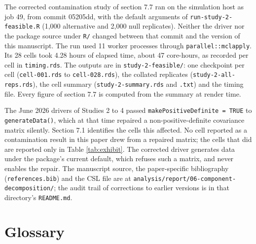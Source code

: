 \documentclass[
  11pt,
]{article}
\begin{document}
The corrected contamination study of section 7.7 ran on the simulation
host as job 49, from commit 05205dd, with the default arguments of
\texttt{run-study-2-feasible.R} (1,000 alternative and 2,000 null
replicates). Neither the driver nor the package source under
\texttt{R/} changed between that commit and the version of this
manuscript. The run used 11 worker processes
through \texttt{parallel::mclapply}. Its 28 cells took
4.28 hours of elapsed time, about
47 core-hours, as recorded per cell in
\texttt{timing.rds}. The outputs are in
\texttt{study-2-feasible/}: one checkpoint per cell
(\texttt{cell-001.rds} to \texttt{cell-028.rds}), the collated
replicates (\texttt{study-2-all-reps.rds}), the cell summary
(\texttt{study-2-summary.rds} and \texttt{.txt}) and the timing file.
Every figure of section 7.7 is computed from the summary at render
time.

The June 2026 drivers of Studies 2 to 4 passed
\texttt{makePositiveDefinite = TRUE} to \texttt{generateData()}, which
at that time repaired a non-positive-definite covariance matrix silently.
Section 7.1 identifies the cells this affected. No cell reported as a
contamination result in this paper drew from a repaired matrix; the cells
that did are reported only in Table \ref{tab:exhibit}. The corrected
driver generates data under the package's current default, which refuses
such a matrix, and never enables the repair. The manuscript source, the
paper-specific bibliography (\texttt{references.bib}) and the CSL file are
at \texttt{analysis/report/06-component-decomposition/}; the audit trail
of corrections to earlier versions is in that directory's
\texttt{README.md}.

\section*{Glossary}\label{glossary}
\end{document}
